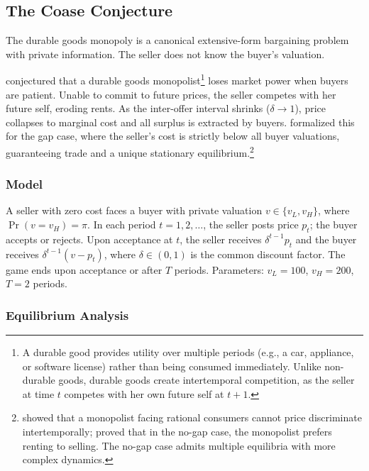 \subsection{The Coase Conjecture}

The durable goods monopoly is a canonical extensive-form bargaining problem with private information. The seller does not know the buyer's valuation.

\citet{coase1972durability} conjectured that a durable goods monopolist\footnote{A durable good provides utility over multiple periods (e.g., a car, appliance, or software license) rather than being consumed immediately. Unlike non-durable goods, durable goods create intertemporal competition, as the seller at time $t$ competes with her own future self at $t+1$.} loses market power when buyers are patient. Unable to commit to future prices, the seller competes with her future self, eroding rents. As the inter-offer interval shrinks ($\delta \to 1$), price collapses to marginal cost and all surplus is extracted by buyers. \citet{gul1986foundations} formalized this for the gap case, where the seller's cost is strictly below all buyer valuations, guaranteeing trade and a unique stationary equilibrium.\footnote{\citet{stokey1981rational} showed that a monopolist facing rational consumers cannot price discriminate intertemporally; \citet{bulow1982durable} proved that in the no-gap case, the monopolist prefers renting to selling. The no-gap case admits multiple equilibria with more complex dynamics.}

\subsubsection{Model}

A seller with zero cost faces a buyer with private valuation $v \in \{v_L, v_H\}$, where $\Pr(v = v_H) = \pi$. In each period $t = 1, 2, \ldots$, the seller posts price $p_t$; the buyer accepts or rejects. Upon acceptance at $t$, the seller receives $\delta^{t-1} p_t$ and the buyer receives $\delta^{t-1}(v - p_t)$, where $\delta \in (0,1)$ is the common discount factor. The game ends upon acceptance or after $T$ periods. Parameters: $v_L = 100$, $v_H = 200$, $T = 2$ periods.

\subsubsection{Equilibrium Analysis}

